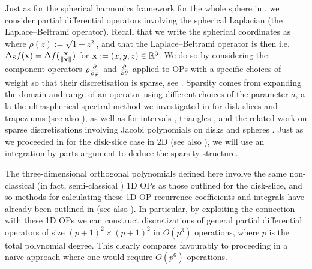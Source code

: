 Just as for the spherical harmonics framework for the whole sphere in , we consider partial differential operators involving the spherical Laplacian (the Laplace--Beltrami operator). Recall that we write the spherical coordinates as
where $ \rho(z) := \sqrt{1-z^2}$, and that the Laplace--Beltrami operator is then
i.e. $\Delta_{\rm S} f(\mathbf{x}) = \Delta f({\mathbf{x} \over \left\| \mathbf{x} \right\|})$ for $\mathbf{x} := (x,y,z) \in \mathbb{R}^3$. We do so by considering the component operators $\rho {\partial \over \partial \varphi}$ and ${\partial \over \partial \theta}$ applied to OPs with a specific choices of weight so that their discretisation is sparse, see . Sparsity comes from expanding the domain and range of an operator using different choices of the parameter $a$, a la the ultraspherical spectral method we investigated in  for disk-slices and trapeziums (see also \cite{snowball2019sparse}), as well as for intervals \cite{olver2013fast}, triangles \cite{olver2019triangle}, and the related work on sparse discretisations involving Jacobi polynomials on disks \cite{vasil2016tensor} and spheres \cite{vasil2019tensor,lecoanet2019tensor}. Just as we proceeded in  for the disk-slice case in 2D (see also \cite{snowball2019sparse}), we will use an integration-by-parts argument to deduce the sparsity structure.

The three-dimensional orthogonal polynomials defined here involve the same non-classical (in fact, semi-classical \cite[\S5]{magnus1995painleve}) 1D OPs as those outlined for the disk-slice, and so methods for calculating these 1D OP recurrence coefficients and integrals have already been outlined in  (see also \cite{snowball2019sparse}). In particular, by exploiting the connection with these 1D OPs we can construct discretizations of general partial differential operators of size $(p+1)^2 \times (p+1)^2$ in $O(p^3)$ operations, where $p$ is the total polynomial degree. This clearly compares favourably to proceeding in a na\"ive approach where one would require $O(p^6)$ operations.

